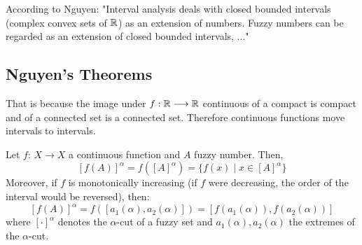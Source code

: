 According to Nguyen: "Interval analysis deals with closed bounded intervals (complex convex sets of $\mathbb{R}$) as an extension of numbers. Fuzzy numbers can be regarded as an extension of closed bounded intervals, ..." 

\begin{definition}[Convexity]
    
\end{definition}

\begin{definition}
    
\end{definition}

\begin{definition}
    
\end{definition}




\subsection{Nguyen's Theorems}

That is because the image under $f:\mathbb{R} \longrightarrow \mathbb{R}$ continuous of a compact is compact and of a connected set is a connected set. Therefore continuous functions move intervals to intervals.

\begin{theorem}
    Let $f:\, X \longrightarrow X$ a continuous function and $A$  fuzzy number. Then,
    \[
    [f(A)]^{\alpha} = f([A]^{\alpha})=\{f(x)\mid x\in [A]^\alpha\}
    \]
    Moreover, if $f$ is monotonically increasing (if $f$ were decreasing, the order of the interval would be reversed), then:
    \[
    [f(A)]^{\alpha} = f([a_1(\alpha), a_2(\alpha)])=
    [f(a_1(\alpha)), f(a_2(\alpha))]
    \]
    where $[\cdot]^\alpha$ denotes the $\alpha$-cut of a fuzzy set and $a_1(\alpha), a_2(\alpha)$ the extremes of the $\alpha$-cut.
\end{theorem}


